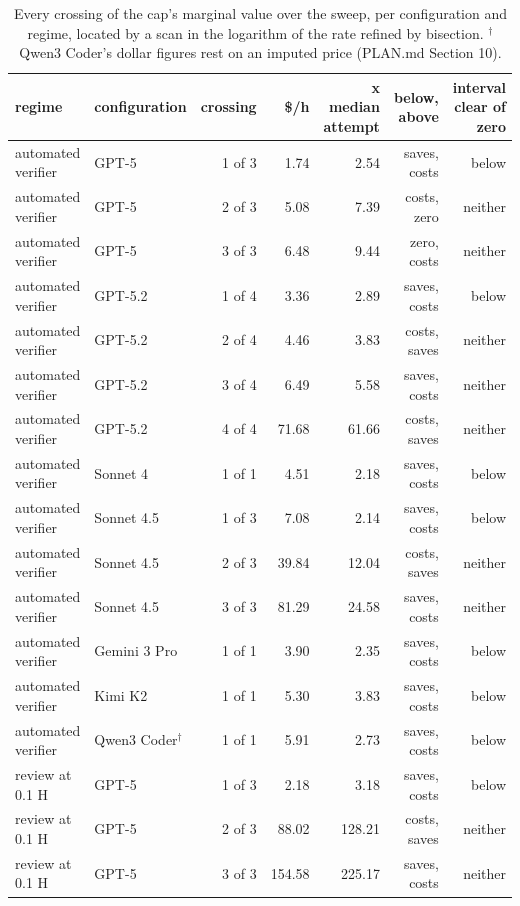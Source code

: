\begin{table}[t]
\centering
\small
\caption{Every crossing of the cap's marginal value over the sweep, per configuration and regime, located by a scan in the logarithm of the rate refined by bisection. $^\dagger$ Qwen3 Coder's dollar figures rest on an imputed price (PLAN.md Section 10).}
\label{tab:tableA11_crossings}
\begin{tabular}{llrrrrr}
\toprule
regime & configuration & crossing & \$/h & x median attempt & below, above & interval clear of zero \\
\midrule
automated verifier & GPT-5 & 1 of 3 & 1.74 & 2.54 & saves, costs & below \\
automated verifier & GPT-5 & 2 of 3 & 5.08 & 7.39 & costs, zero & neither \\
automated verifier & GPT-5 & 3 of 3 & 6.48 & 9.44 & zero, costs & neither \\
automated verifier & GPT-5.2 & 1 of 4 & 3.36 & 2.89 & saves, costs & below \\
automated verifier & GPT-5.2 & 2 of 4 & 4.46 & 3.83 & costs, saves & neither \\
automated verifier & GPT-5.2 & 3 of 4 & 6.49 & 5.58 & saves, costs & neither \\
automated verifier & GPT-5.2 & 4 of 4 & 71.68 & 61.66 & costs, saves & neither \\
automated verifier & Sonnet 4 & 1 of 1 & 4.51 & 2.18 & saves, costs & below \\
automated verifier & Sonnet 4.5 & 1 of 3 & 7.08 & 2.14 & saves, costs & below \\
automated verifier & Sonnet 4.5 & 2 of 3 & 39.84 & 12.04 & costs, saves & neither \\
automated verifier & Sonnet 4.5 & 3 of 3 & 81.29 & 24.58 & saves, costs & neither \\
automated verifier & Gemini 3 Pro & 1 of 1 & 3.90 & 2.35 & saves, costs & below \\
automated verifier & Kimi K2 & 1 of 1 & 5.30 & 3.83 & saves, costs & below \\
automated verifier & Qwen3 Coder$^\dagger$ & 1 of 1 & 5.91 & 2.73 & saves, costs & below \\
\midrule
review at 0.1 H & GPT-5 & 1 of 3 & 2.18 & 3.18 & saves, costs & below \\
review at 0.1 H & GPT-5 & 2 of 3 & 88.02 & 128.21 & costs, saves & neither \\
review at 0.1 H & GPT-5 & 3 of 3 & 154.58 & 225.17 & saves, costs & neither \\

\end{tabular}
\end{table}
